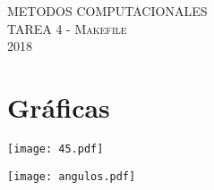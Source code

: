 \documentclass[11pt,letterpaper]{exam}
\begin{document}
\begin{center}
{\Large METODOS COMPUTACIONALES} \\
TAREA 4 - \textsc{Makefile}\\
2018\\
\end{center}


\noindent
\section{Gr\'aficas}
\begin{center}
\texttt{[image: 45.pdf]} 
\begin{center}
\end{center}
\texttt{[image: angulos.pdf]} 
\end{center}
\end{document}
